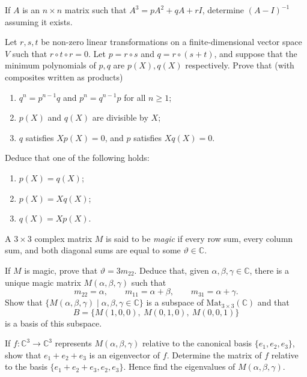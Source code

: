 \documentclass[12pt]{article}
\begin{document}
\begin{problem}
If $A$ is an $n \times n$ matrix such that $A^3 = pA^2 + qA + rI$, determine $(A-I)^{-1}$ assuming it exists.
\end{problem}

\begin{problem}
Let $r,s,t$ be non-zero linear transformations on a finite-dimensional vector space $V$ such that $r\circ t\circ r=0$. Let $p=r\circ s$ and $q=r\circ(s+t)$, and suppose that the minimum polynomials of $p,q$ are $p(X),q(X)$ respectively. Prove that (with composites written as products)
\begin{enumerate}[label=(\arabic*)]
\item $q^n=p^{n-1}q$ and $p^n=q^{n-1}p$ for all $n\ge 1$;
\item $p(X)$ and $q(X)$ are divisible by $X$;
\item $q$ satisfies $Xp(X)=0$, and $p$ satisfies $Xq(X)=0$.
\end{enumerate}
Deduce that one of the following holds:
\begin{enumerate}[label=(\roman*)]
\item $p(X)=q(X)$;
\item $p(X)=Xq(X)$;
\item $q(X)=Xp(X)$.
\end{enumerate}
\end{problem}

\begin{problem}
A $3\times 3$ complex matrix $M$ is said to be \emph{magic} if every row sum, every column sum, and both diagonal sums are equal to some $\vartheta\in\mathbb{C}$.

If $M$ is magic, prove that $\vartheta=3m_{22}$. Deduce that, given $\alpha,\beta,\gamma\in\mathbb{C}$, there is a unique magic matrix $M(\alpha,\beta,\gamma)$ such that
\[
m_{22}=\alpha,\qquad m_{11}=\alpha+\beta,\qquad m_{31}=\alpha+\gamma.
\]
Show that $\{M(\alpha,\beta,\gamma)\mid \alpha,\beta,\gamma\in\mathbb{C}\}$ is a subspace of $\mathrm{Mat}_{3\times 3}(\mathbb{C})$ and that
\[
B=\{M(1,0,0),\ M(0,1,0),\ M(0,0,1)\}
\]
is a basis of this subspace.

If $f:\mathbb{C}^3\to\mathbb{C}^3$ represents $M(\alpha,\beta,\gamma)$ relative to the canonical basis $\{e_1,e_2,e_3\}$, show that $e_1+e_2+e_3$ is an eigenvector of $f$. Determine the matrix of $f$ relative to the basis $\{e_1+e_2+e_3,e_2,e_3\}$. Hence find the eigenvalues of $M(\alpha,\beta,\gamma)$.
\end{problem}
\end{document}
